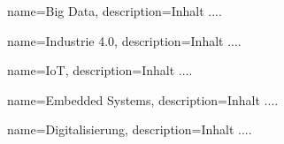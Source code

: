 \makeglossaries




{
	name=Big Data,
	description={Inhalt ....}
}


{
	name=Industrie 4.0,
	description={Inhalt ....}
}


{
	name=IoT,
	description={Inhalt ....}
}


{
	name=Embedded Systems,
	description={Inhalt ....}
}


{
	name=Digitalisierung,
	description={Inhalt ....}
}




